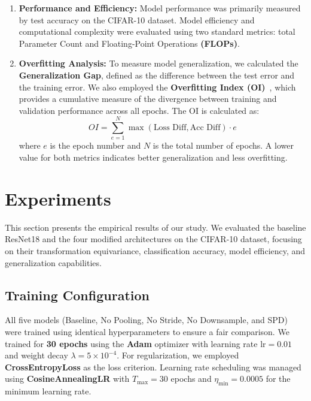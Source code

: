 \documentclass[conference]{IEEEtran}
\begin{document}
\begin{enumerate}
    \item \textbf{Performance and Efficiency:} Model performance was primarily measured by test accuracy on the CIFAR-10 dataset. Model efficiency and computational complexity were evaluated using two standard metrics: total Parameter Count and Floating-Point Operations\textbf{ (FLOPs)}.

    \item \textbf{Overfitting Analysis:} To measure model generalization, we calculated the \textbf{Generalization Gap}, defined as the difference between the test error and the training error. We also employed the \textbf{Overfitting Index (OI)}~\cite{aburass2023}, which provides a cumulative measure of the divergence between training and validation performance across all epochs. The OI is calculated as:
    \begin{equation}
        OI=\sum_{e=1}^{N}\max(\text{Loss Diff}, \text{Acc Diff})\cdot e
        \label{eq:oi}
    \end{equation}
    where $e$ is the epoch number and $N$ is the total number of epochs. A lower value for both metrics indicates better generalization and less overfitting.
\end{enumerate}
\section{Experiments}\label{sec:experiments}

This section presents the empirical results of our study. We evaluated the baseline ResNet18 and the four modified architectures on the CIFAR-10 dataset, focusing on their transformation equivariance, classification accuracy, model efficiency, and generalization capabilities.


\subsection{Training Configuration}\label{subsec:training_config}
All five models (Baseline, No Pooling, No Stride, No Downsample, and SPD) were trained using identical hyperparameters to ensure a fair comparison. We trained for \textbf{30 epochs} using the \textbf{Adam} optimizer with learning rate $\text{lr}=0.01$ and weight decay $\lambda=5 \times 10^{-4}$. For regularization, we employed \textbf{CrossEntropyLoss} as the loss criterion. Learning rate scheduling was managed using \textbf{CosineAnnealingLR} with $T_{\max}=30$ epochs and $\eta_{\min}=0.0005$ for the minimum learning rate.
\end{document}
